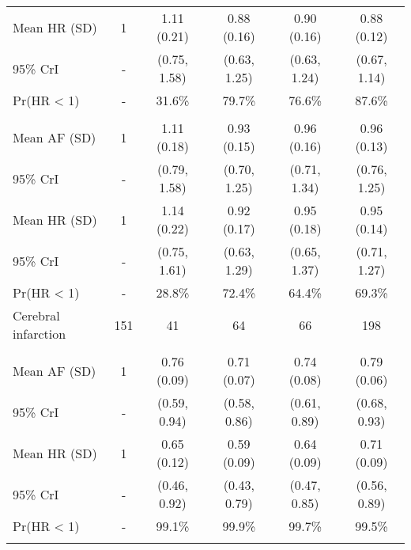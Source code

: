 \documentclass[nutrients,article,submitted,moreauthors,pdftex]{Definitions/mdpi}
\begin{document}
\begin{table}[H]
{\begin{tabular}[t]{lccccc}
\rowcolor{gray!6}  \hspace{1em}Mean HR (SD) & 1 & 1.11 (0.21) & 0.88 (0.16) & 0.90 (0.16) & 0.88 (0.12)\\
\hspace{1em}95\% CrI & - & (0.75, 1.58) & (0.63, 1.25) & (0.63, 1.24) & (0.67, 1.14)\\
\rowcolor{gray!6}  \hspace{1em}Pr(HR < 1) & - & 31.6\% & 79.7\% & 76.6\% & 87.6\%\\
\addlinespace[0.3em]
\multicolumn{6}{l}{\textbf{Model 2}}\\
\hspace{1em}Mean AF (SD) & 1 & 1.11 (0.18) & 0.93 (0.15) & 0.96 (0.16) & 0.96 (0.13)\\
\rowcolor{gray!6}  \hspace{1em}95\% CrI & - & (0.79, 1.58) & (0.70, 1.25) & (0.71, 1.34) & (0.76, 1.25)\\
\hspace{1em}Mean HR (SD) & 1 & 1.14 (0.22) & 0.92 (0.17) & 0.95 (0.18) & 0.95 (0.14)\\
\rowcolor{gray!6}  \hspace{1em}95\% CrI & - & (0.75, 1.61) & (0.63, 1.29) & (0.65, 1.37) & (0.71, 1.27)\\
\hspace{1em}Pr(HR < 1) & - & 28.8\% & 72.4\% & 64.4\% & 69.3\%\\
\hline
\rowcolor{gray!6}  Cerebral infarction & 151 & 41 & 64 & 66 & 198\\
\addlinespace[0.3em]
\multicolumn{6}{l}{\textbf{Model 0}}\\
\hspace{1em}Mean AF (SD) & 1 & 0.76 (0.09) & 0.71 (0.07) & 0.74 (0.08) & 0.79 (0.06)\\
\rowcolor{gray!6}  \hspace{1em}95\% CrI & - & (0.59, 0.94) & (0.58, 0.86) & (0.61, 0.89) & (0.68, 0.93)\\
\hspace{1em}Mean HR (SD) & 1 & 0.65 (0.12) & 0.59 (0.09) & 0.64 (0.09) & 0.71 (0.09)\\
\rowcolor{gray!6}  \hspace{1em}95\% CrI & - & (0.46, 0.92) & (0.43, 0.79) & (0.47, 0.85) & (0.56, 0.89)\\
\hspace{1em}Pr(HR < 1) & - & 99.1\% & 99.9\% & 99.7\% & 99.5\%\\
\addlinespace[0.3em]
\multicolumn{6}{l}{\textbf{Model 1}}\\

\end{tabular}}
\end{table}
\end{document}
